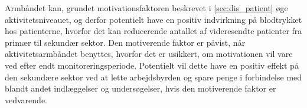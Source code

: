 Armbåndet kan, grundet motivationsfaktoren beskrevet i \autoref{sec:dis_patient} øge aktivitetsniveauet, og derfor potentielt have en positiv indvirkning på blodtrykket hos patienterne, hvorfor det kan reducerende antallet af videresendte patienter fra primær til sekundær sektor. Den motiverende faktor er påvist, når aktivitetsarmbåndet benyttes, hvorfor det er usikkert, om motivationen vil vare ved efter endt monitoreringsperiode. Potentielt vil dette have en positiv effekt på den sekundære sektor ved at lette arbejdsbyrden og spare penge i forbindelse med blandt andet indlæggelser og undersøgelser, hvis den motiverende faktor er vedvarende.

